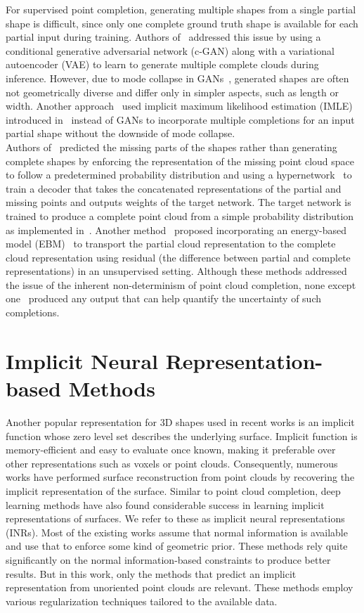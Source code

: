 For supervised point completion, generating multiple shapes from a single partial shape is difficult, since only one complete ground truth shape is available for each partial input during training. Authors of~\cite{CGAN} addressed this issue by using a conditional generative adversarial network (c-GAN) along with a variational autoencoder (VAE) to learn to generate multiple complete clouds during inference. However, due to mode collapse in GANs~\cite{ModeCollapseGAN}, generated shapes are often not geometrically diverse and differ only in simpler aspects, such as length or width. Another approach~\cite{PCCIMLE} used implicit maximum likelihood estimation (IMLE) introduced in~\cite{IMLE} instead of GANs to incorporate multiple completions for an input partial shape without the downside of mode collapse. 
\\
Authors of~\cite{HyperPocket} predicted the missing parts of the shapes rather than generating complete shapes by enforcing the representation of the missing point cloud space to follow a predetermined probability distribution and using a hypernetwork~\cite{Hypernet} to train a decoder that takes the concatenated representations of the partial and missing points and outputs weights of the target network. The target network is trained to produce a complete point cloud from a simple probability distribution as implemented in~\cite{PCHypernet}. Another method~\cite{EBResLT} proposed incorporating an energy-based model (EBM)~\cite{EBM} to transport the partial cloud representation to the complete cloud representation using residual (the difference between partial and complete representations) in an unsupervised setting. Although these methods addressed the issue of the inherent non-determinism of point cloud completion, none except one~\cite{EBResLT} produced any output that can help quantify the uncertainty of such completions.


\section{Implicit Neural Representation-based Methods}\label{INR-old}
Another popular representation for 3D shapes used in recent works is an implicit function whose zero level set describes the underlying surface. Implicit function is memory-efficient and easy to evaluate once known, making it preferable over other representations such as voxels or point clouds. Consequently, numerous works have performed surface reconstruction from point clouds by recovering the implicit representation of the surface. Similar to point cloud completion, deep learning methods have also found considerable success in learning implicit representations of surfaces. We refer to these as implicit neural representations (INRs). Most of the existing works assume that normal information is available and use that to enforce some kind of geometric prior. These methods rely quite significantly on the normal information-based constraints to produce better results. But in this work, only the methods that predict an implicit representation from unoriented point clouds are relevant. These methods employ various regularization techniques tailored to the available data. 
\newline

